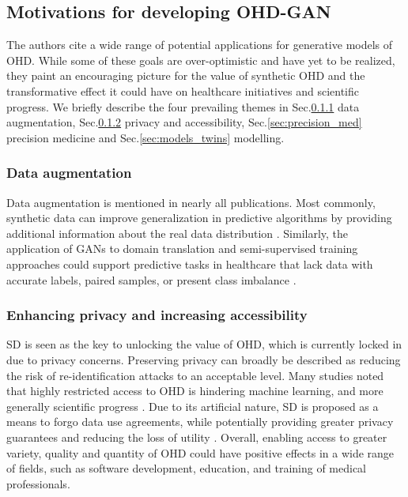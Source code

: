 \subsection{Motivations for developing OHD-GAN}
The authors cite a wide range of potential applications for generative models of OHD. While some of these goals are over-optimistic and have yet to be realized, they paint an encouraging picture for the value of synthetic OHD and the transformative effect it could have on healthcare initiatives and scientific progress. We briefly describe the four prevailing themes in Sec.\ref{sec:augmentation} data augmentation, Sec.\ref{sec:access_privacy} privacy and accessibility, Sec.\ref{sec:precision_med} precision medicine and Sec.\ref{sec:models_twins} modelling. 

    \subsubsection{Data augmentation}\label{sec:augmentation}
    Data augmentation is mentioned in nearly all publications. Most commonly, synthetic data can improve generalization in predictive algorithms by providing additional information about the real data distribution \cite{Wang_2019,Che_2017,Yoon2018-dm, Yoon2018-mo}. Similarly, the application of GANs to domain translation and semi-supervised training approaches could support predictive tasks in healthcare that lack data with accurate labels, paired samples, or present class imbalance \cite{Che_2017,mcdermott2018semi}. 

    \subsubsection{Enhancing privacy and increasing accessibility}\label{sec:access_privacy}
    SD is seen as the key to unlocking the value of OHD, which is currently locked in due to privacy concerns. Preserving privacy can broadly be described as reducing the risk of re-identification attacks to an acceptable level. Many studies noted that highly restricted access to OHD is hindering machine learning, and more generally scientific progress \cite{Beaulieu-Jones2019-ct, Baowaly_2019,Che_2017,esteban2017real,Fisher2019}. Due to its artificial nature, SD is proposed as a means to forgo data use agreements, while potentially providing greater privacy guarantees and reducing the loss of utility \cite{Beaulieu-Jones2019-ct, Baowaly_2019,esteban2017real,Fisher2019,walsh2020generating}. Overall, enabling access to greater variety, quality and quantity of OHD could have positive effects in a wide range of fields, such as software development, education, and training of medical professionals. 
    
